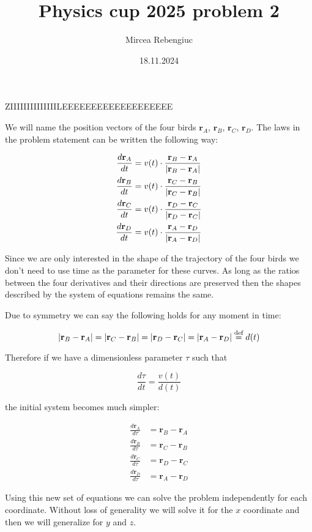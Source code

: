 \documentclass{article}
\title{Physics cup 2025 problem 2}
\author{Mircea Rebengiuc}
\date{18.11.2024}
\newcommand{\vect}[1]{\mathbf{#1}}
\newcommand*{\defeq}{\stackrel{\text{def}}{=}}
\begin{document}
\maketitle

ZIIIIIIIIIIIIIILEEEEEEEEEEEEEEEEEEE

We will name the position vectors of the four birds $\vect r_A$, $\vect r_B$, $\vect r_C$, $\vect r_D$.
The laws in the problem statement can be written the following way:

\begin{align*}
    \frac{d\vect r_A}{dt} &= v(t) \cdot \frac{\vect r_B - \vect r_A}{\abs{\vect r_B - \vect r_A}} \\
    \frac{d\vect r_B}{dt} &= v(t) \cdot \frac{\vect r_C - \vect r_B}{\abs{\vect r_C - \vect r_B}} \\
    \frac{d\vect r_C}{dt} &= v(t) \cdot \frac{\vect r_D - \vect r_C}{\abs{\vect r_D - \vect r_C}} \\
    \frac{d\vect r_D}{dt} &= v(t) \cdot \frac{\vect r_A - \vect r_D}{\abs{\vect r_A - \vect r_D}}
\end{align*}

Since we are only interested in the shape of the trajectory of the four birds we don't need to use time as the parameter for these curves. As long as the ratios between the four derivatives and their directions are preserved then the shapes described by the system of equations remains the same.

Due to symmetry we can say the following holds for any moment in time:

\[\abs{\vect r_B - \vect r_A} = \abs{\vect r_C - \vect r_B} = \abs{\vect r_D - \vect r_C} = \abs{\vect r_A - \vect r_D} \defeq d(t) \]

Therefore if we have a dimensionless parameter $\tau$ such that

\[\frac{d\tau}{dt} = \frac{v(t)}{d(t)}\]

the initial system becomes much simpler:

\begin{align*}
    \frac{d\vect r_A}{d\tau} &= \vect r_B - \vect r_A \\
    \frac{d\vect r_B}{d\tau} &= \vect r_C - \vect r_B \\
    \frac{d\vect r_C}{d\tau} &= \vect r_D - \vect r_C \\
    \frac{d\vect r_D}{d\tau} &= \vect r_A - \vect r_D
\end{align*}

Using this new set of equations we can solve the problem independently for each coordinate. Without loss of generality we will solve it for the $x$ coordinate and then we will generalize for $y$ and $z$.
\end{document}
